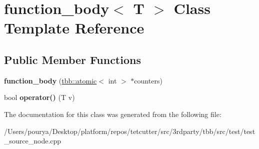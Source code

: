 \hypertarget{classfunction__body}{}\section{function\+\_\+body$<$ T $>$ Class Template Reference}
\label{classfunction__body}
\subsection*{Public Member Functions}
\begin{DoxyCompactItemize}
\item 
\hypertarget{classfunction__body_a8d7c3441ec21e5036e03f0cef265153b}{}{\bfseries function\+\_\+body} (\hyperlink{structtbb_1_1atomic}{tbb\+::atomic}$<$ int $>$ $\ast$counters)\label{classfunction__body_a8d7c3441ec21e5036e03f0cef265153b}

\item 
\hypertarget{classfunction__body_af85d038ada24717ca2ca27aa7df8192b}{}bool {\bfseries operator()} (T v)\label{classfunction__body_af85d038ada24717ca2ca27aa7df8192b}

\end{DoxyCompactItemize}


The documentation for this class was generated from the following file\+:\begin{DoxyCompactItemize}
\item 
/\+Users/pourya/\+Desktop/platform/repos/tetcutter/src/3rdparty/tbb/src/test/test\+\_\+source\+\_\+node.\+cpp\end{DoxyCompactItemize}
